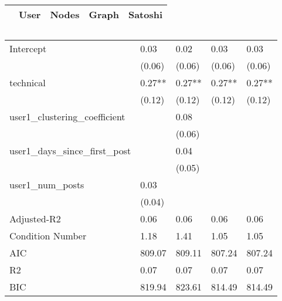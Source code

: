 \begin{table}
\caption{}
\begin{center}
\begin{tabular}{lcccc}
\hline
                             &  User  & Nodes  & Graph  & Satoshi  \\
\hline
\hline
\end{tabular}
\begin{tabular}{lllll}
Intercept                    & 0.03   & 0.02   & 0.03   & 0.03     \\
                             & (0.06) & (0.06) & (0.06) & (0.06)   \\
technical                    & 0.27** & 0.27** & 0.27** & 0.27**   \\
                             & (0.12) & (0.12) & (0.12) & (0.12)   \\
user1_clustering_coefficient &        & 0.08   &        &          \\
                             &        & (0.06) &        &          \\
user1_days_since_first_post  &        & 0.04   &        &          \\
                             &        & (0.05) &        &          \\
user1_num_posts              & 0.03   &        &        &          \\
                             & (0.04) &        &        &          \\
Adjusted-R2                  & 0.06   & 0.06   & 0.06   & 0.06     \\
Condition Number             & 1.18   & 1.41   & 1.05   & 1.05     \\
AIC                          & 809.07 & 809.11 & 807.24 & 807.24   \\
R2                           & 0.07   & 0.07   & 0.07   & 0.07     \\
BIC                          & 819.94 & 823.61 & 814.49 & 814.49   \\
\hline
\end{tabular}
\end{center}
\end{table}